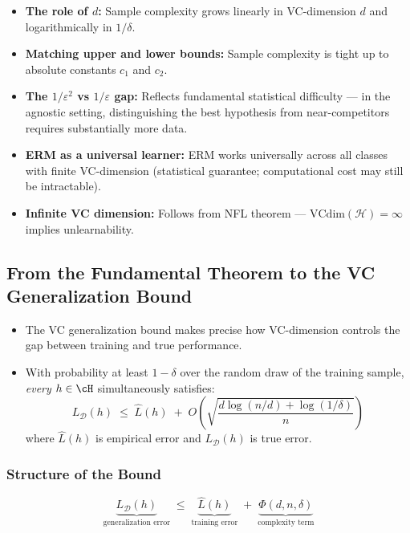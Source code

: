 \begin{itemize}
    \item \textbf{The role of $d$:} Sample complexity grows linearly in VC-dimension $d$ and logarithmically in $1/\delta$.
    \item \textbf{Matching upper and lower bounds:} Sample complexity is tight up to absolute constants $c_1$ and $c_2$.
    \item \textbf{The $1/\varepsilon^2$ vs $1/\varepsilon$ gap:} Reflects fundamental statistical difficulty — in the agnostic setting, distinguishing the best hypothesis from near-competitors requires substantially more data.
    \item \textbf{ERM as a universal learner:} ERM works universally across all classes with finite VC-dimension (statistical guarantee; computational cost may still be intractable).
    \item \textbf{Infinite VC dimension:} Follows from NFL theorem — $\mathrm{VCdim}(\mathcal{H}) = \infty$ implies unlearnability.
\end{itemize}

\subsection*{From the Fundamental Theorem to the VC Generalization Bound}

\begin{itemize}
    \item The VC generalization bound makes precise how VC-dimension controls the gap between training and true performance.
    \item With probability at least $1-\delta$ over the random draw of the training sample, \emph{every} $h \in \cH$ simultaneously satisfies:
    \begin{equation}
    \label{eq:vcbound}
    L_{\mathcal{D}}(h) \;\le\; \hat{L}(h) \;+\;
    O\!\left(\sqrt{\frac{d\log(n/d) + \log(1/\delta)}{n}}\right)
    \end{equation}
    where $\hat{L}(h)$ is empirical error and $L_{\mathcal{D}}(h)$ is true error.
\end{itemize}

\subsubsection*{Structure of the Bound}
\[
\underbrace{L_{\mathcal{D}}(h)}_{\text{generalization error}}
\;\le\;
\underbrace{\hat{L}(h)}_{\text{training error}}
\;+\;
\underbrace{\Phi(d,n,\delta)}_{\text{complexity term}}
\]

